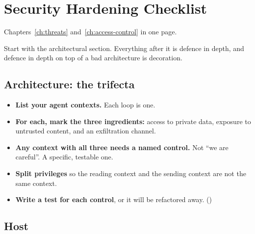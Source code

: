\chapter{Security Hardening Checklist}
\label{ch:security-checklist}

Chapters~\ref{ch:threats} and~\ref{ch:access-control} in one page.

Start with the architectural section. Everything after it is defence in depth,
and defence in depth on top of a bad architecture is decoration.

\section{Architecture: the trifecta}

\begin{itemize}[leftmargin=1.6em, itemsep=3pt]
\item[$\square$] \textbf{List your agent contexts.} Each loop is one.
\item[$\square$] \textbf{For each, mark the three ingredients:} access to private
data, exposure to untrusted content, and an exfiltration channel.
\item[$\square$] \textbf{Any context with all three needs a named control.} Not
``we are careful''. A specific, testable one.
\item[$\square$] \textbf{Split privileges} so the reading context and the sending
context are not the same context.
\item[$\square$] \textbf{Write a test for each control}, or it will be
refactored away. ()
\end{itemize}

\section{Host}

